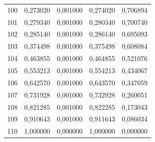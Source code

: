 \begin{small}
\begin{longtable}{rrrrr}
100 & 0,273020 & 0,001000 & 0,274020 & 0,706894 \\
101 & 0,279340 & 0,001000 & 0,280340 & 0,700740 \\
102 & 0,285140 & 0,001000 & 0,286140 & 0,695093 \\
103 & 0,374498 & 0,001000 & 0,375498 & 0,608084 \\
104 & 0,463855 & 0,001000 & 0,464855 & 0,521076 \\
105 & 0,553213 & 0,001000 & 0,554213 & 0,434067 \\
106 & 0,642570 & 0,001000 & 0,643570 & 0,347059 \\
107 & 0,731928 & 0,001000 & 0,732928 & 0,260051 \\
108 & 0,821285 & 0,001000 & 0,822285 & 0,173043 \\
109 & 0,910643 & 0,001000 & 0,911643 & 0,086034 \\
110 & 1,000000 & 0,000000 & 1,000000 & 0,000000 \\
\end{longtable}
\end{small}
